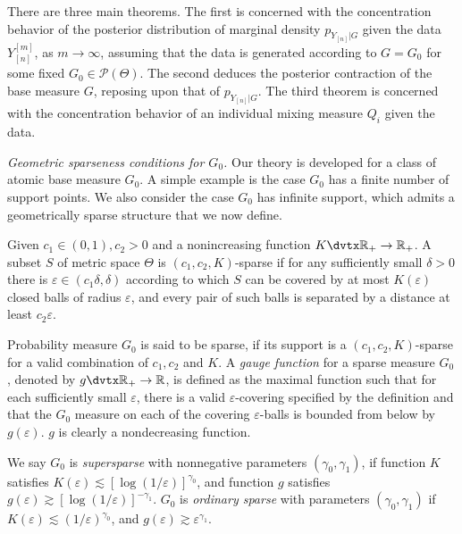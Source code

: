 \documentclass[MSNbibl,number,citesort]{arxbj}
\newcommand{\real}{\mathbb{R}}
\newcommand{\Pcal}{\mathscr{P}}
\newcommand{\gauge}{g}
\newcommand{\YYn}{Y_{[n]}}
\begin{document}
There are three main theorems. The first is concerned with the
concentration behavior of the posterior distribution of marginal
density ${p_{Y_{[n]}|G}}$ given
the data $\YYn^{[m]}$, as $m \rightarrow\infty$, assuming that
the data is generated according to $G = G_0$ for some fixed
$G_0 \in\Pcal(\Theta)$. The second deduces the posterior contraction
of the base measure $G$, reposing upon that of ${p_{Y_{[n]}|G}}$.
The third theorem is
concerned with the concentration behavior of an individual
mixing measure $Q_i$ given the data.

\textit{Geometric sparseness conditions for $G_0$.} Our theory is
developed for a class of atomic base measure $G_0$. A simple example
is the case $G_0$ has a finite number of support
points. We also consider the case $G_0$ has infinite support,
which admits a geometrically sparse structure that we now define.

%
\begin{definition}
\label{Def-sparse}
Given $c_1 \in(0,1), c_2 > 0$ and a nonincreasing function
$K\dvtx\real_+\rightarrow\real_+$. A subset $S$ of metric space
$\Theta$ is $(c_1,c_2,K)$-sparse
if for any sufficiently small
$\delta> 0$ there is $\varepsilon\in(c_1\delta,\delta)$
according to which $S$ can
be covered by at most $K(\varepsilon)$ closed balls of radius
$\varepsilon$,
and every pair of such balls is separated by a distance at least
$c_2\varepsilon$.
\end{definition}

Probability measure $G_0$ is said to be sparse, if its support is a
$(c_1,c_2,K)$-sparse for a valid combination of
$c_1,c_2$ and $K$.
A \emph{gauge function} for a sparse measure $G_0$, denoted by
$\gauge\dvtx\real_+\rightarrow\real$, is defined
as the maximal function such that for each sufficiently small
$\varepsilon$,
there is a valid $\varepsilon$-covering specified
by the definition and that the $G_0$ measure on each of the covering
$\varepsilon$-balls is bounded from below by
$\gauge(\varepsilon)$. $\gauge$ is clearly a nondecreasing function.

We say $G_0$ is \emph{supersparse} with
nonnegative parameters $(\gamma_0,\gamma_1)$, if
function $K$ satisfies $K(\varepsilon) \lesssim[\log(1/\varepsilon
)]^{\gamma_0}$,
and function $\gauge$ satisfies
$\gauge(\varepsilon) \gtrsim[\log(1/\varepsilon)]^{-\gamma_1}$.
$G_0$ is \emph{ordinary sparse} with parameters $(\gamma_0,\gamma
_1)$ if
$K(\varepsilon) \lesssim(1/\varepsilon)^{\gamma_0}$,
and $\gauge(\varepsilon) \gtrsim\varepsilon^{\gamma_1}$.
\end{document}
